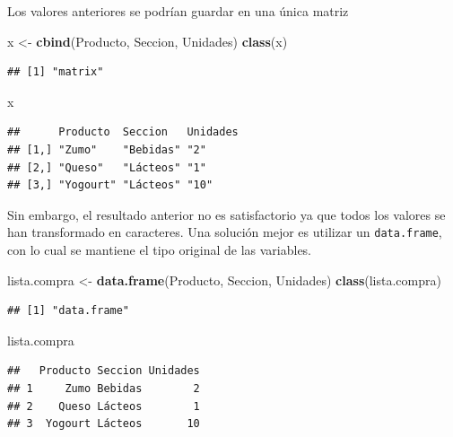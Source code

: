 \documentclass[]{book}
\newenvironment{Shaded}{\begin{snugshade}}{\end{snugshade}}
\newcommand{\KeywordTok}[1]{\textcolor[rgb]{0.13,0.29,0.53}{\textbf{#1}}}
\newcommand{\StringTok}[1]{\textcolor[rgb]{0.31,0.60,0.02}{#1}}
\newcommand{\NormalTok}[1]{#1}
\begin{document}
Los valores anteriores se podrían guardar en una única matriz

\begin{Shaded}
\begin{Highlighting}[]
\NormalTok{x <-}\StringTok{ }\KeywordTok{cbind}\NormalTok{(Producto, Seccion, Unidades)}
\KeywordTok{class}\NormalTok{(x)}
\end{Highlighting}
\end{Shaded}

\begin{verbatim}
## [1] "matrix"
\end{verbatim}

\begin{Shaded}
\begin{Highlighting}[]
\NormalTok{x}
\end{Highlighting}
\end{Shaded}

\begin{verbatim}
##      Producto  Seccion   Unidades
## [1,] "Zumo"    "Bebidas" "2"     
## [2,] "Queso"   "Lácteos" "1"     
## [3,] "Yogourt" "Lácteos" "10"
\end{verbatim}

Sin embargo, el resultado anterior no es satisfactorio ya que todos los
valores se han transformado en caracteres. Una solución mejor es
utilizar un \texttt{data.frame}, con lo cual se mantiene el tipo
original de las variables.

\begin{Shaded}
\begin{Highlighting}[]
\NormalTok{lista.compra <-}\StringTok{ }\KeywordTok{data.frame}\NormalTok{(Producto, Seccion, Unidades)}
\KeywordTok{class}\NormalTok{(lista.compra)}
\end{Highlighting}
\end{Shaded}

\begin{verbatim}
## [1] "data.frame"
\end{verbatim}

\begin{Shaded}
\begin{Highlighting}[]
\NormalTok{lista.compra}
\end{Highlighting}
\end{Shaded}

\begin{verbatim}
##   Producto Seccion Unidades
## 1     Zumo Bebidas        2
## 2    Queso Lácteos        1
## 3  Yogourt Lácteos       10
\end{verbatim}
\end{document}
